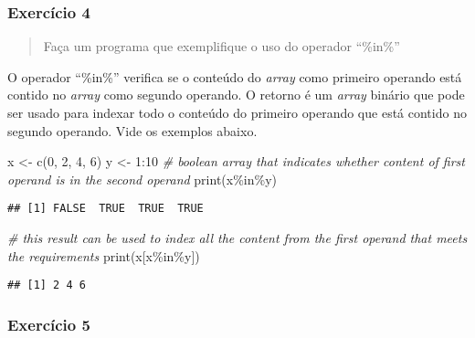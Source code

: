 \documentclass[
]{article}
\newenvironment{Shaded}{\begin{snugshade}}{\end{snugshade}}
\newcommand{\CommentTok}[1]{\textcolor[rgb]{0.56,0.35,0.01}{\textit{#1}}}
\newcommand{\DecValTok}[1]{\textcolor[rgb]{0.00,0.00,0.81}{#1}}
\newcommand{\FunctionTok}[1]{\textcolor[rgb]{0.00,0.00,0.00}{#1}}
\newcommand{\NormalTok}[1]{#1}
\newcommand{\OtherTok}[1]{\textcolor[rgb]{0.56,0.35,0.01}{#1}}
\newcommand{\SpecialCharTok}[1]{\textcolor[rgb]{0.00,0.00,0.00}{#1}}
\begin{document}
\hypertarget{exercuxedcio-4}{%
\subsubsection{Exercício 4}\label{exercuxedcio-4}}

\begin{quote}
Faça um programa que exemplifique o uso do operador ``\%in\%''
\end{quote}

O operador ``\%in\%'' verifica se o conteúdo do \emph{array} como
primeiro operando está contido no \emph{array} como segundo operando. O
retorno é um \emph{array} binário que pode ser usado para indexar todo o
conteúdo do primeiro operando que está contido no segundo operando. Vide
os exemplos abaixo.

\begin{Shaded}
\begin{Highlighting}[]
\NormalTok{x }\OtherTok{\textless{}{-}} \FunctionTok{c}\NormalTok{(}\DecValTok{0}\NormalTok{, }\DecValTok{2}\NormalTok{, }\DecValTok{4}\NormalTok{, }\DecValTok{6}\NormalTok{)}
\NormalTok{y }\OtherTok{\textless{}{-}} \DecValTok{1}\SpecialCharTok{:}\DecValTok{10}
\CommentTok{\# boolean array that indicates whether content of first operand is in the second operand}
\FunctionTok{print}\NormalTok{(x}\SpecialCharTok{\%in\%}\NormalTok{y)}
\end{Highlighting}
\end{Shaded}

\begin{verbatim}
## [1] FALSE  TRUE  TRUE  TRUE
\end{verbatim}

\begin{Shaded}
\begin{Highlighting}[]
\CommentTok{\# this result can be used to index all the content from the first operand that meets the requirements}
\FunctionTok{print}\NormalTok{(x[x}\SpecialCharTok{\%in\%}\NormalTok{y])}
\end{Highlighting}
\end{Shaded}

\begin{verbatim}
## [1] 2 4 6
\end{verbatim}

\hypertarget{exercuxedcio-5}{%
\subsubsection{Exercício 5}\label{exercuxedcio-5}}
\end{document}
